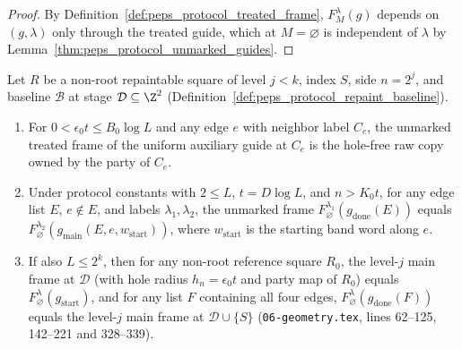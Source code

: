 \begin{proof}\leanok
    By Definition~\ref{def:peps_protocol_treated_frame}, $F_M^\lambda(g)$ depends on $(g,\lambda)$ only through the treated guide, which at $M=\varnothing$ is independent of $\lambda$ by Lemma~\ref{thm:peps_protocol_unmarked_guides}.
\end{proof}

\begin{lemma}
    \label{thm:peps_protocol_treated_frame_ends}
    \leanok
    Let $R$ be a non-root repaintable square of level $j<k$, index $S$, side $n=2^j$, and baseline $\mathcal B$ at stage $\mathcal D\subseteq\Z^2$ (Definition~\ref{def:peps_protocol_repaint_baseline}).
    \begin{enumerate}
        \item For $0<\epsilon_0t\le B_0\log L$ and any edge $e$ with neighbor label $C_e$, the unmarked treated frame of the uniform auxiliary guide at $C_e$ is the hole-free raw copy owned by the party of $C_e$.
        \item Under protocol constants with $2\le L$, $t=D\log L$, and $n>K_0t$, for any edge list $E$, $e\notin E$, and labels $\lambda_1,\lambda_2$, the unmarked frame $F_\varnothing^{\lambda_1}(g_{\mathrm{done}}(E))$ equals $F_\varnothing^{\lambda_2}(g_{\mathrm{main}}(E,e,w_{\mathrm{start}}))$, where $w_{\mathrm{start}}$ is the starting band word along $e$.
        \item If also $L\le 2^k$, then for any non-root reference square $R_0$, the level-$j$ main frame at $\mathcal D$ (with hole radius $h_n=\epsilon_0t$ and party map of $R_0$) equals $F_\varnothing^\lambda(g_{\mathrm{start}})$, and for any list $F$ containing all four edges, $F_\varnothing^\lambda(g_{\mathrm{done}}(F))$ equals the level-$j$ main frame at $\mathcal D\cup\{S\}$ (\texttt{06-geometry.tex}, lines 62--125, 142--221 and 328--339).
    \end{enumerate}
\end{lemma}

